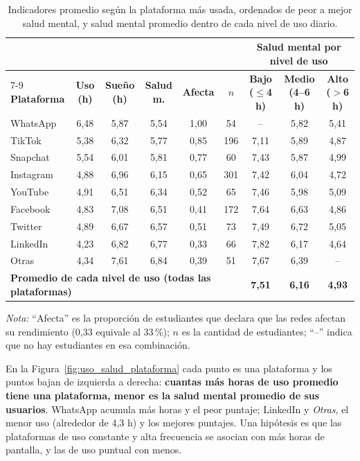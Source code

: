 \begin{table}[H]
\centering
\footnotesize
\setlength{\tabcolsep}{4pt}
\caption{Indicadores promedio según la plataforma más usada, ordenados de peor a mejor salud mental, y
salud mental promedio dentro de cada nivel de uso diario.}
\label{tab:plataforma}
\begin{tabular}{l ccccc ccc}
\toprule
& & & & & & \multicolumn{3}{c}{\textbf{Salud mental por nivel de uso}} \\
\cmidrule(lr){7-9}
\textbf{Plataforma} & \textbf{Uso (h)} & \textbf{Sueño (h)} & \textbf{Salud m.} & \textbf{Afecta} & \textbf{$n$}
& \textbf{Bajo ($\leq$4 h)} & \textbf{Medio (4--6 h)} & \textbf{Alto ($>$6 h)} \\
\midrule
WhatsApp  & 6,48 & 5,87 & 5,54 & 1,00 & 54  & --   & 5,82 & 5,41 \\
TikTok    & 5,38 & 6,32 & 5,77 & 0,85 & 196 & 7,11 & 5,89 & 4,87 \\
Snapchat  & 5,54 & 6,01 & 5,81 & 0,77 & 60  & 7,43 & 5,87 & 4,99 \\
Instagram & 4,88 & 6,96 & 6,15 & 0,65 & 301 & 7,42 & 6,04 & 4,72 \\
YouTube   & 4,91 & 6,51 & 6,34 & 0,52 & 65  & 7,46 & 5,98 & 5,09 \\
Facebook  & 4,83 & 7,08 & 6,51 & 0,41 & 172 & 7,64 & 6,63 & 4,86 \\
Twitter   & 4,89 & 6,67 & 6,57 & 0,51 & 73  & 7,49 & 6,72 & 5,05 \\
LinkedIn  & 4,23 & 6,82 & 6,77 & 0,33 & 66  & 7,82 & 6,17 & 4,64 \\
Otras     & 4,34 & 7,61 & 6,84 & 0,39 & 51  & 7,67 & 6,39 & --   \\
\midrule
\multicolumn{6}{l}{\textbf{Promedio de cada nivel de uso (todas las plataformas)}} & \textbf{7,51} & \textbf{6,16} & \textbf{4,93} \\
\bottomrule
\end{tabular}

\smallskip
{\footnotesize\textit{Nota:} “Afecta” es la proporción de estudiantes que declara que las redes afectan su
rendimiento (0,33 equivale al 33\,\%); $n$ es la cantidad de estudiantes; “--” indica que no hay
estudiantes en esa combinación.}
\end{table}

En la Figura~\ref{fig:uso_salud_plataforma} cada punto es una plataforma y los puntos bajan de izquierda
a derecha: \textbf{cuantas más horas de uso promedio tiene una plataforma, menor es la salud mental promedio
de sus usuarios}. WhatsApp acumula más horas y el peor puntaje; LinkedIn y \emph{Otras}, el menor uso
(alrededor de 4,3 h) y los mejores puntajes. Una hipótesis es que las plataformas de uso constante y alta
frecuencia se asocian con más horas de pantalla, y las de uso puntual con menos.

